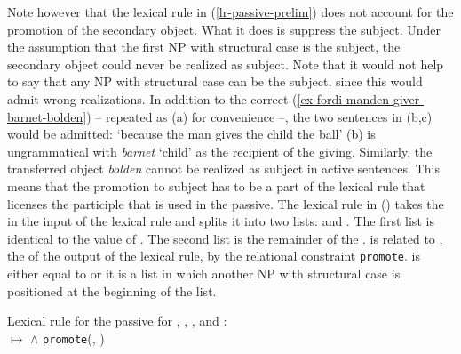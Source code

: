 Note however that the lexical rule in (\ref{lr-passive-prelim}) does not account for the promotion
of the secondary object. What it does is suppress the subject. Under the assumption that the
first NP with structural case is the subject, the secondary object could never be realized as
subject. Note that it would not help to say that any NP with structural case can be the subject, since
this would admit wrong realizations. In addition to the correct
(\ref{ex-fordi-manden-giver-barnet-bolden}) -- repeated as (a) for convenience --, the two sentences in (b,c) would be admitted: 
\eal
{}
\glt `because the man gives the child the ball'
\zl
(b) is ungrammatical with \emph{barnet} `child' as the recipient of the giving. Similarly, the
transferred object \emph{bolden} cannot be realized as subject in active sentences. This means that
the promotion to subject has to be a part of the lexical  rule that licenses the participle that is
used in the passive. The lexical rule in () takes the \argstl in the input of the lexical rule and splits it into two
lists:  and . The first list  is identical to the value of \da. The second list  is the
remainder of the \argstl.  is related to , the \argstv of the output of the lexical rule, by the relational constraint
\texttt{promote}.  is either equal to  or it is a list in which another NP with
structural case is positioned at the beginning of the list.

\eas
\label{lr-passive-double-object}%
Lexical rule for the passive for , , , and :\\
 $\mapsto$
 $\wedge$ \texttt{promote}(, )
\zs

